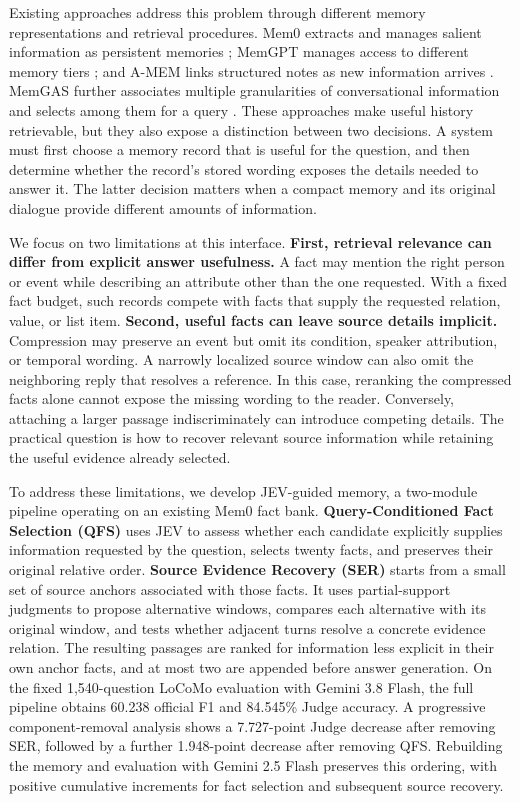 \documentclass[11pt]{article}
\newcommand{\method}{JEV-guided memory}
\newcommand{\qfs}{\textsc{QFS}}
\newcommand{\ser}{\textsc{SER}}
\begin{document}
Existing approaches address this problem through different memory representations and retrieval procedures. Mem0 extracts and manages salient information as persistent memories \citep{chhikara2025mem0}; MemGPT manages access to different memory tiers \citep{packer2023memgpt}; and A-MEM links structured notes as new information arrives \citep{xu2025amem}. MemGAS further associates multiple granularities of conversational information and selects among them for a query \citep{xu2025memgas}. These approaches make useful history retrievable, but they also expose a distinction between two decisions. A system must first choose a memory record that is useful for the question, and then determine whether the record's stored wording exposes the details needed to answer it. The latter decision matters when a compact memory and its original dialogue provide different amounts of information.

We focus on two limitations at this interface. \textbf{First, retrieval relevance can differ from explicit answer usefulness.} A fact may mention the right person or event while describing an attribute other than the one requested. With a fixed fact budget, such records compete with facts that supply the requested relation, value, or list item. \textbf{Second, useful facts can leave source details implicit.} Compression may preserve an event but omit its condition, speaker attribution, or temporal wording. A narrowly localized source window can also omit the neighboring reply that resolves a reference. In this case, reranking the compressed facts alone cannot expose the missing wording to the reader. Conversely, attaching a larger passage indiscriminately can introduce competing details. The practical question is how to recover relevant source information while retaining the useful evidence already selected.

To address these limitations, we develop \method{}, a two-module pipeline operating on an existing Mem0 fact bank. \textbf{Query-Conditioned Fact Selection (\qfs{})} uses JEV to assess whether each candidate explicitly supplies information requested by the question, selects twenty facts, and preserves their original relative order. \textbf{Source Evidence Recovery (\ser{})} starts from a small set of source anchors associated with those facts. It uses partial-support judgments to propose alternative windows, compares each alternative with its original window, and tests whether adjacent turns resolve a concrete evidence relation. The resulting passages are ranked for information less explicit in their own anchor facts, and at most two are appended before answer generation. On the fixed 1,540-question LoCoMo evaluation with Gemini 3.8 Flash, the full pipeline obtains 60.238 official F1 and 84.545\% Judge accuracy. A progressive component-removal analysis shows a 7.727-point Judge decrease after removing \ser{}, followed by a further 1.948-point decrease after removing \qfs{}. Rebuilding the memory and evaluation with Gemini 2.5 Flash preserves this ordering, with positive cumulative increments for fact selection and subsequent source recovery.
\end{document}
